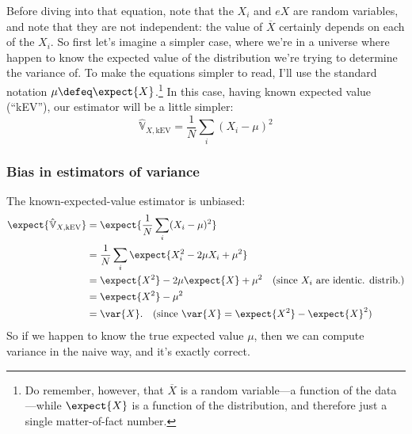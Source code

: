 
Before diving into that equation, note that the $X_i$ and $e{X}$ are
random variables, and note that they are not independent: the value of
$\overline{X}$ certainly depends on each of the $X_i$. So first let's imagine
a simpler case, where we're in a universe where happen to know the expected
value of the distribution we're trying to determine the variance of. To make
the equations simpler to read, I'll use the standard notation $\mu \defeq
\expect{X}$.\footnote{Do remember, however, that $\overline{X}$ is a random
variable---a function of the data---while $\expect{X}$ is a function of the
distribution, and therefore just a single matter-of-fact number.} In this
case, having known expected value (``kEV''), our estimator will be a little
simpler:
\begin{equation}
\hat{\mathbb{V}}_{X,\mathrm{kEV}} = \frac{1}{N} \sum_i ( X_i - \mu )^2
\end{equation}

\subsubsection{Bias in estimators of variance}

The known-expected-value estimator is unbiased:
\begin{align*}
\expect{\hat{\mathbb{V}}_{X,\mathrm{kEV}}}
  &= \expect{\frac{1}{N} \sum_i ( X_i - \mu )^2} \\
  &= \frac{1}{N} \sum_i \expect{X_i^2 - 2\mu X_i + \mu^2} \\
  &= \expect{X^2} - 2 \mu \expect{X} + \mu^2 \quad\text{(since $X_i$ are identic. distrib.)} \\
  &= \expect{X^2} - \mu^2 \\
  &= \var{X}. \quad\text{(since $\var{X} = \expect{X^2} - \expect{X}^2$)}
\end{align*}
So if we happen to know the true expected value $\mu$, then we can compute
variance in the naive way, and it's exactly correct.

